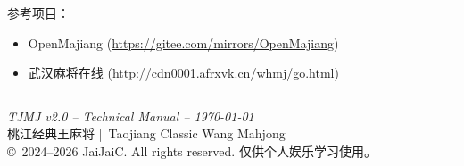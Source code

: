 \documentclass[11pt,a4paper]{article}
\begin{document}
参考项目：
\begin{itemize}[nosep]
  \item OpenMajiang (\url{https://gitee.com/mirrors/OpenMajiang})
  \item 武汉麻将在线 (\url{http://cdn0001.afrxvk.cn/whmj/go.html})
\end{itemize}

\vfill
\begin{center}
\rule{\linewidth}{0.4pt}
{\small\textit{TJMJ v2.0 -- Technical Manual -- \today}}\\[2pt]
{\tiny 桃江经典王麻将\,\,|\, Taojiang Classic Wang Mahjong}\\[2pt]
{\tiny \copyright\ 2024--2026 JaiJaiC. All rights reserved. 仅供个人娱乐学习使用。}
\end{center}
\end{document}
